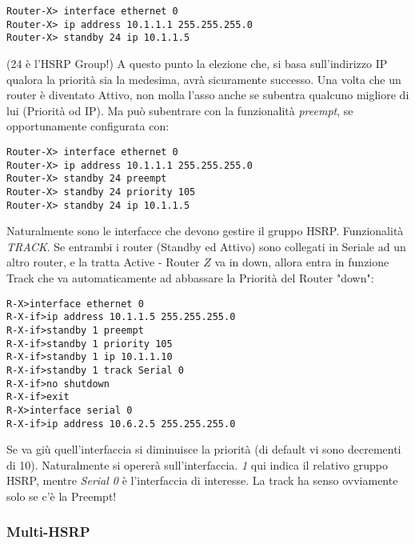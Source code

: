 \begin{lstlisting}[language=CISCO]
Router-X> interface ethernet 0
Router-X> ip address 10.1.1.1 255.255.255.0
Router-X> standby 24 ip 10.1.1.5
\end{lstlisting}

(24 è l'HSRP Group!) A questo punto la elezione che, si basa sull'indirizzo IP qualora la priorità sia la medesima, avrà sicuramente successo. Una volta che un router è diventato Attivo, non molla l'asso anche se subentra qualcuno migliore di lui (Priorità od IP). Ma può subentrare con la funzionalità \textit{preempt}, se opportunamente configurata con:

\begin{lstlisting}[language=CISCO]
Router-X> interface ethernet 0
Router-X> ip address 10.1.1.1 255.255.255.0
Router-X> standby 24 preempt
Router-X> standby 24 priority 105
Router-X> standby 24 ip 10.1.1.5
\end{lstlisting}

Naturalmente sono le interfacce che devono gestire il gruppo HSRP. Funzionalità \textit{TRACK}. Se entrambi i router (Standby ed Attivo) sono collegati in Seriale ad un altro router, e la tratta Active - Router $\mathit{Z}$ va in down, allora entra in funzione Track che va automaticamente ad abbassare la Priorità del Router "down":

\begin{lstlisting}[language=CISCO]
R-X>interface ethernet 0
R-X-if>ip address 10.1.1.5 255.255.255.0
R-X-if>standby 1 preempt
R-X-if>standby 1 priority 105
R-X-if>standby 1 ip 10.1.1.10
R-X-if>standby 1 track Serial 0
R-X-if>no shutdown 
R-X-if>exit
R-X>interface serial 0
R-X-if>ip address 10.6.2.5 255.255.255.0
\end{lstlisting}

Se va giù quell'interfaccia si diminuisce la priorità (di default vi sono decrementi di 10). Naturalmente si opererà sull'interfaccia. \textit{1} qui indica il relativo gruppo HSRP, mentre \textit{Serial 0} è l'interfaccia di interesse. La track ha senso ovviamente solo se c'è la Preempt!

\subsubsection{Multi-HSRP}

